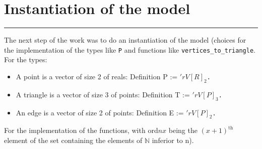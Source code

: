 \documentclass[a4paper,10pt]{article}
\def\definition#1#2{{\color{purple}Definition} {\color{blue}#1} := {\tt #2}}
\begin{document}
\section{Instantiation of the model}
\rule{\linewidth}{0.5pt}
\label{implementation}
The next step of the work was to do an instantiation of the model (choices for the implementation of the types like {\tt P} and functions like {\tt vertices\_to\_triangle}. For the types:
\begin{itemize}
\item A point is a vector of size 2 of reals: \definition{P}{$'rV[R]_2$. }
\item A triangle is a vector of size 3 of points: \definition{T}{$'rV[P]_3$. }
\item An edge is a vector of size 2 of points: \definition{E}{$'rV[P]_2$. }
\end{itemize}
For the implementation of the functions, with ord$nx$ being the $(x+1)^{\text{th}}$ element of the set containing the elements of $\mathbb{N}$ inferior to n).
\end{document}
